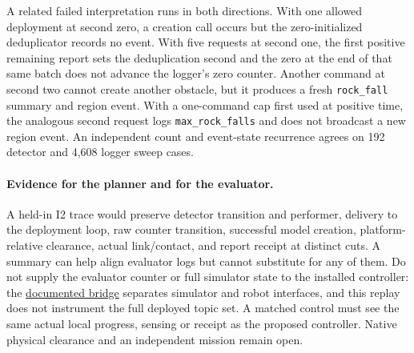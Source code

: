 \documentclass[11pt]{article}
\begin{document}
A related failed interpretation runs in both directions. With one
allowed deployment at second zero, a creation call occurs but the
zero-initialized deduplicator records no event. With five requests at
second one, the first positive remaining report sets the deduplication
second and the zero at the end of that same batch does not advance the
logger's zero counter. Another command at second two cannot create
another obstacle, but it produces a fresh \texttt{rock\_fall} summary
and region event. With a one-command cap first used at positive time,
the analogous second request logs \texttt{max\_rock\_falls} and does not
broadcast a new region event. An independent count and event-state
recurrence agrees on 192 detector and 4,608 logger sweep cases.

\paragraph{Evidence for the planner and for the evaluator.}
A held-in I2 trace would preserve detector transition and performer,
delivery to the deployment loop, raw counter transition, successful
model creation, platform-relative clearance, actual link/contact, and
report receipt at distinct cuts. A summary can help align evaluator
logs but cannot substitute for any of them. Do not supply the evaluator
counter or full simulator state to the installed controller: the
\href{https://github.com/osrf/subt/wiki/Cloudsim-Architecture}{documented bridge}
separates simulator and robot interfaces, and this replay does not
instrument the full deployed topic set. A matched control must see
the same actual local progress, sensing or receipt as the proposed
controller. Native physical clearance and an independent mission
remain open.
\end{document}
